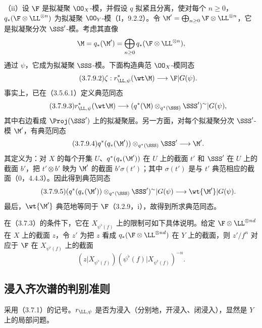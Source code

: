 （ii）设 $\F$ 是拟凝聚 $\OO_X$-模，并假设 $q$ 拟紧且分离，使对每个 $n\geq0$，$q_*(\F\otimes\LL^{\otimes n})$ 为拟凝聚 $\OO_Y$-模（I，9.2.2）。令
$\M'=\bigoplus_{n\geq0}\F\otimes\LL^{\otimes n}$，它是拟凝聚分次 $\SSS'$-模。考虑其直像
\[
\M=q_*(\M')=\bigoplus_{n\geq0}q_*(\F\otimes\LL^{\otimes n}),
\]
通过 $\psi$，它成为拟凝聚 $\SSS$-模。下面构造典范 $\OO_X$-模同态
\begin{equation}\tag{3.7.9.2}\zeta:r_{\LL,\psi}^*(\wt\M)\longrightarrow\F|G(\psi).\end{equation}
事实上，已在（3.5.6.1）定义典范同态
\begin{equation}\tag{3.7.9.3}
r_{\LL,\psi}^*(\wt\M)\longrightarrow
(q^*(\M)\otimes_{q^*(\SSS)}\SSS')^\sim|G(\psi),
\end{equation}
其中右边看成 $\Proj(\SSS')$ 上的拟凝聚层。另一方面，对每个拟凝聚分次 $\SSS'$-模 $\M'$，有典范同态
\begin{equation}\tag{3.7.9.4}
q^*(q_*(\M'))\otimes_{q^*(\SSS)}\SSS'\longrightarrow\M'.
\end{equation}
其定义为：对 $X$ 的每个开集 $U$、$q^*(q_*(\M'))$ 在 $U$ 上的截面 $t'$ 和 $\SSS'$ 在 $U$ 上的截面 $b'$，把 $t'\otimes b'$ 映为 $\M'$ 的截面 $b'\sigma(t')$；其中 $\sigma(t')$ 是与 $t'$ 典范相应的截面（0，4.4.3）。因此得到典范同态
\begin{equation}\tag{3.7.9.5}
(q^*(q_*(\M'))\otimes_{q^*(\SSS)}\SSS')^\sim|G(\psi)
\longrightarrow\wt{\M'}|G(\psi).
\end{equation}
最后，$\wt{\M'}$ 典范地等同于 $\F$（3.2.9，i），故得到所求典范同态。

在（3.7.3）的条件下，它在 $X_{\psi^\flat(f)}$ 上的限制可如下具体说明。给定 $\F\otimes\LL^{\otimes nd}$ 在 $X$ 上的截面 $z$，令 $z'$ 为把 $z$ 看成 $q_*(\F\otimes\LL^{\otimes nd})$ 在 $Y$ 上的截面，则 $z'/f^n$ 对应于 $\F$ 在 $X_{\psi^\flat(f)}$ 上的截面
\[
(z|X_{\psi^\flat(f)})(\psi^\flat(f)|X_{\psi^\flat(f)})^{-n}.
\]

\subsection{浸入齐次谱的判别准则}
采用（3.7.1）的记号。$r_{\LL,\psi}$ 是否为浸入（分别地，开浸入、闭浸入），显然是 $Y$ 上的局部问题。


